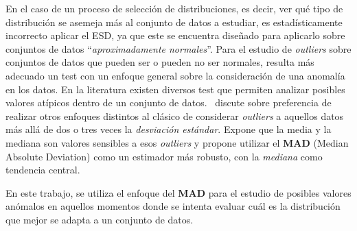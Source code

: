 En el caso de un proceso de selección de distribuciones, es decir, ver qué tipo de distribución se asemeja más
al conjunto de datos a estudiar, es estadísticamente incorrecto aplicar el ESD, ya que este se encuentra
diseñado para aplicarlo sobre conjuntos de datos \enquote{\textit{aproximadamente normales}}. Para el estudio
de \textit{outliers} sobre conjuntos de datos que pueden ser o pueden no ser normales, resulta
más adecuado un test con un enfoque general sobre la consideración de una anomalía en los datos.
En la literatura existen diversos test que permiten analizar posibles valores atípicos dentro de un conjunto de
datos.~\textcite{leys2013detecting} discute sobre preferencia de realizar otros enfoques distintos al clásico de 
considerar \textit{outliers} a aquellos datos más allá de dos o tres veces la \textit{desviación estándar}. Expone 
que la media y la mediana son valores sensibles a esos \textit{outliers} y propone utilizar el \textbf{MAD} (Median Absolute
Deviation) como un estimador más robusto, con la \textit{mediana} como tendencia central.

En este trabajo, se utiliza el enfoque del \textbf{MAD} para el estudio de posibles valores anómalos en aquellos 
momentos donde se intenta evaluar cuál es la distribución que mejor se adapta a un conjunto de datos.